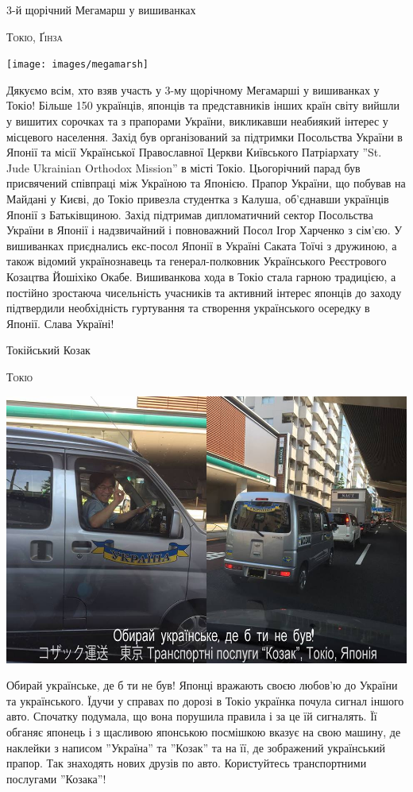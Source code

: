 \documentclass[10pt,a4paper]{article}
\newcommand{\NewsItem}[1]{%
		\usefont{T2A}{iwona}{m}{n} 
		\large #1 \vspace{4pt}
		\par \normalsize \normalfont}
\newcommand{\NewsAuthor}[1]{%
			\hfill \textsc{#1} \vspace{4pt}
			\par \normalfont}
\begin{document}
\begin{multicols}{3}
\vspace{1cm}
	\NewsItem{3-й щорічний Мегамарш у вишиванках}
	\NewsAuthor{Токіо, Ґінза}
		\begin{center}
			\texttt{[image: images/megamarsh]}
		\end{center}
Дякуємо всім, хто взяв участь у 3-му щорічному Мегамарші у вишиванках у Токіо! Більше 150 українців, японців та представників інших країн світу вийшли у вишитих сорочках та з прапорами України, викликавши неабиякий інтерес у місцевого населення. Захід був організований за підтримки Посольства України в Японії та місії Української Православної Церкви Київського Патріархату ''St. Jude Ukrainian Orthodox Mission'' в місті Токіо. Цьогорічний парад був присвячений співпраці між Україною та Японією. Прапор України, що побував на Майдані у Києві, до Токіо привезла студентка з Калуша, об'єднавши українців Японії з Батьківщиною. Захід підтримав дипломатичний сектор Посольства України в Японії і надзвичайний і повноважний Посол Ігор Харченко з сім'єю. У вишиванках приєднались екс-посол Японії в Україні Саката Тоїчі з дружиною, а також відомий українознавець та генерал-полковник Українського Реєстрового Козацтва Йошіхіко Окабе. Вишиванкова хода в Токіо стала гарною традицією, а постійно зростаюча чисельність учасників та активний інтерес японців до заходу підтвердили необхідність гуртування та створення українського осередку в Японії. Слава Україні!

\vspace{1cm}
\NewsItem{Токійський Козак}
\NewsAuthor{Токіо}
		\begin{center}
			\includegraphics[width=0.8\linewidth]{images/kozak}
		\end{center}
Обирай українське, де б ти не був! Японці вражають своєю любов'ю до України та українського. Їдучи у справах по дорозі в Токіо українка почула сигнал іншого авто. Спочатку подумала, що вона порушила правила і за це їй сигналять. Її обганяє японець і з щасливою японською посмішкою вказує на свою машину, де наклейки з написом ''Україна'' та ''Козак'' та на її, де зображений український прапор. Так знаходять нових друзів по авто. Користуйтесь транспортними послугами ''Козака''! 


\end{multicols}
\end{document}

